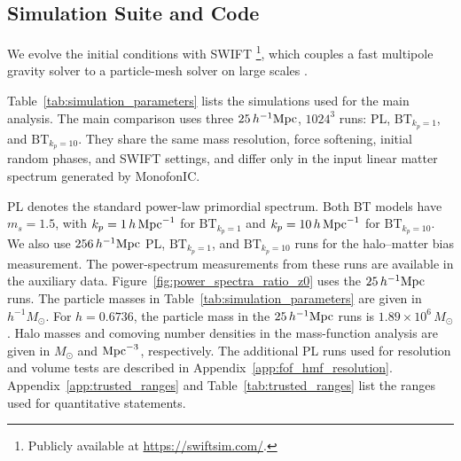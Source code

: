 \documentclass[
 reprint,
 superscriptaddress,
 nofootinbib,
 nobibnotes,
 amsmath,
 amssymb,
 aps,
 prd,
 floatfix,
 longbibliography
]{revtex4-2}
\DeclareRobustCommand{\change}[1]{#1}
\DeclareRobustCommand{\BTKPone}{\ensuremath{\mathrm{BT}_{k_p=1}}}
\DeclareRobustCommand{\BTKPten}{\ensuremath{\mathrm{BT}_{k_p=10}}}
\begin{document}
\subsection{Simulation Suite and Code}
\label{subsec:simulation_suite}
\label{subsec:Terminology}

\change{We evolve the initial conditions with \textsc{SWIFT} \citep{Schaller2024SWIFT}\footnote{Publicly available at \url{https://swiftsim.com/}.}, which couples a fast multipole gravity solver \citep{Dehn00FMM} to a particle-mesh solver on large scales \citep{Hock88PM}.}

\change{Table~\ref{tab:simulation_parameters} lists the simulations used for the main analysis.} The main comparison uses three \(25\,h^{-1}{\rm Mpc}\), \(1024^3\) runs: PL, \BTKPone{}, and \BTKPten{}. They share the same mass resolution, force softening, initial random phases, and \textsc{SWIFT} settings, and differ only in the input linear matter spectrum generated by MonofonIC.




\change{PL denotes the standard power-law primordial spectrum. Both BT models have \(m_s=1.5\), with \(k_p=1\,h\,{\rm Mpc}^{-1}\) for \BTKPone{} and \(k_p=10\,h\,{\rm Mpc}^{-1}\) for \BTKPten{}. We also use \(256\,h^{-1}{\rm Mpc}\) PL, \BTKPone{}, and \BTKPten{} runs for the halo--matter bias measurement. The power-spectrum measurements from these runs are available in the auxiliary data. Figure~\ref{fig:power_spectra_ratio_z0} uses the \(25\,h^{-1}{\rm Mpc}\) runs. The particle masses in Table~\ref{tab:simulation_parameters} are given in \(h^{-1}M_\odot\). For \(h=0.6736\), the particle mass in the \(25\,h^{-1}{\rm Mpc}\) runs is \(1.89\times10^6\,M_\odot\). Halo masses and comoving number densities in the mass-function analysis are given in \(M_\odot\) and \({\rm Mpc}^{-3}\), respectively. The additional PL runs used for resolution and volume tests are described in Appendix~\ref{app:fof_hmf_resolution}. Appendix~\ref{app:trusted_ranges} and Table~\ref{tab:trusted_ranges} list the ranges used for quantitative statements.}
\end{document}
